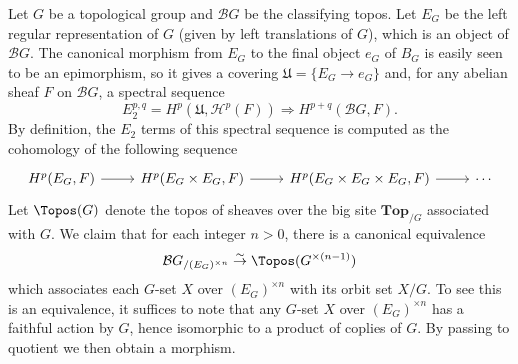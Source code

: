 \begin{example}
Let $G$ be a topological group and $\mathcal{B}G$ be the classifying topos. Let $E_G$ be the left regular representation of $G$ (given by left translations of $G$), which is an object of $\mathcal{B}G$. The canonical morphism from $E_G$ to the final object $e_G$ of $B_G$ is easily seen to be an epimorphism, so it gives a covering $\mathfrak{U}=\{E_G\to e_G\}$ and, for any abelian sheaf $F$ on $\mathcal{B}G$, a spectral sequence
\begin{equation}\label{topos BG spectral sequence of E_G to e_G}
E_2^{p,q}=H^p(\mathfrak{U},\mathcal{H}^p(F))\Rightarrow H^{p+q}(\mathcal{B}G,F).
\end{equation}
By definition, the $E_2$ terms of this spectral sequence is computed as the cohomology of the following sequence
\[\begin{tikzcd}
H^p(E_G,F)\ar[r]&H^p(E_G\times E_G,F)\ar[r]&H^p(E_G\times E_G\times E_G,F)\ar[r]&\cdots
\end{tikzcd}\]
Let $\Topos(G)$ denote the topos of sheaves over the big site $\mathbf{Top}_{/G}$ associated with $G$. We claim that for each integer $n>0$, there is a canonical equivalence
\[\mathcal{B}G_{/(E_G)^{\times n}} \stackrel{\sim}{\to } \Topos(G^{\times(n-1)})\]
which associates each $G$-set $X$ over $(E_G)^{\times n}$ with its orbit set $X/G$. To see this is an equivalence, it suffices to note that any $G$-set $X$ over $(E_G)^{\times n}$ has a faithful action by $G$, hence isomorphic to a product of coplies of $G$. By passing to quotient we then obtain a morphism.
\end{example}

